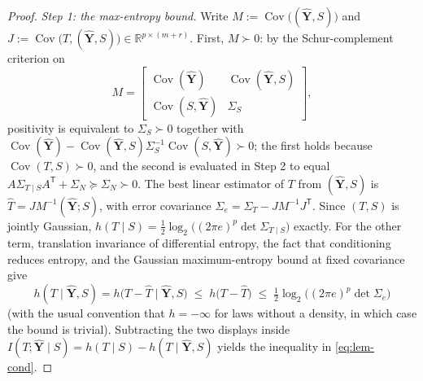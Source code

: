﻿\documentclass[11pt,onecolumn]{IEEEtran}
\newcommand{\R}{\mathbb{R}}
\newcommand{\Cov}{\operatorname{Cov}}
\begin{document}
\begin{proof}
\emph{Step 1: the max-entropy bound.} Write
$M:=\Cov\bigl((\hat{\mathbf Y},S)\bigr)$ and
$J:=\Cov\bigl(T,(\hat{\mathbf Y},S)\bigr)\in\R^{p\times(m+r)}$. First,
$M\succ0$: by the Schur-complement criterion on
\[
M=\begin{bmatrix}
\Cov(\hat{\mathbf Y})&\Cov(\hat{\mathbf Y},S)\\[2pt]
\Cov(S,\hat{\mathbf Y})&\Sigma_S
\end{bmatrix},
\]
positivity is equivalent to $\Sigma_S\succ0$ together with
$\Cov(\hat{\mathbf Y})-\Cov(\hat{\mathbf Y},S)\Sigma_S^{-1}
\Cov(S,\hat{\mathbf Y})\succ0$; the first holds because
$\Cov(T,S)\succ0$, and the second is evaluated in Step 2 to equal
$A\Sigma_{T\mid S}A^{\mathsf T}+\Sigma_N\succeq\Sigma_N\succ0$. The best
linear estimator of $T$ from $(\hat{\mathbf Y},S)$ is
$\widehat T=JM^{-1}(\hat{\mathbf Y};S)$, with error covariance
$\Sigma_e=\Sigma_T-JM^{-1}J^{\mathsf T}$. Since $(T,S)$ is jointly
Gaussian,
$h(T\mid S)=\tfrac12\log_2\bigl((2\pi e)^p\det\Sigma_{T\mid S}\bigr)$
exactly. For the other term, translation invariance of differential
entropy, the fact that conditioning reduces entropy, and the Gaussian maximum-entropy
bound at fixed covariance give
\[
h(T\mid\hat{\mathbf Y},S)
=h\bigl(T-\widehat T\;\big|\;\hat{\mathbf Y},S\bigr)
\;\le\;h\bigl(T-\widehat T\bigr)
\;\le\;\tfrac12\log_2\bigl((2\pi e)^p\det\Sigma_e\bigr)
\]
(with the usual convention that $h=-\infty$ for laws without a
density, in which case the bound is trivial).
Subtracting the two displays inside
$I(T;\hat{\mathbf Y}\mid S)=h(T\mid S)-h(T\mid\hat{\mathbf Y},S)$
yields the inequality in \eqref{eq:lem-cond}.


\end{proof}
\end{document}
